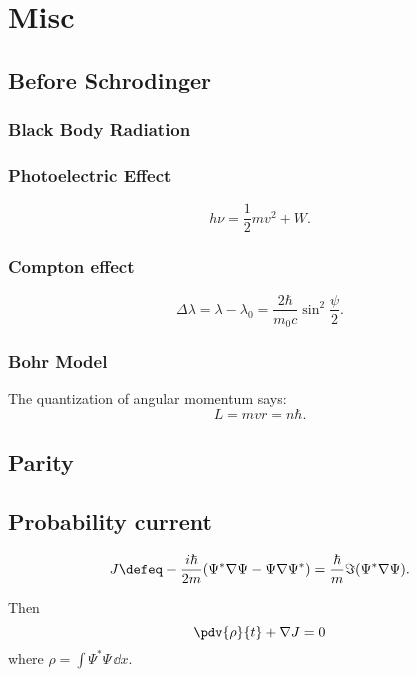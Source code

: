 \section{Misc}
\subsection{Before Schrodinger}

\subsubsection{Black Body Radiation}

\subsubsection{Photoelectric Effect}
\[
    h\nu=\frac{1}{2}mv^2+W
.\] 
\subsubsection{Compton effect}
\[
    \Delta\lambda=\lambda-\lambda_0=\frac{2\hbar}{m_0c}\sin^2\frac{\psi}{2}
.\] 

\subsubsection{Bohr Model}
The quantization of angular momentum says:
\[
    L=mvr=n\hbar
.\] 

\subsection{Parity}

\subsection{Probability current}

\begin{defi}
	\[
	    J
		\defeq
		-\frac{i\hbar}{2m}(\Psi^*\nabla\Psi-\Psi\nabla\Psi^*)
		=
		\frac{\hbar}{m}\Im(\Psi^*\nabla\Psi)
	.\] 
\end{defi}

Then 
\[
	\pdv{\rho}{t}+\nabla J = 0
\] 
where $\displaystyle \rho=\int\Psi^*\Psi\,\dd{x}$.

